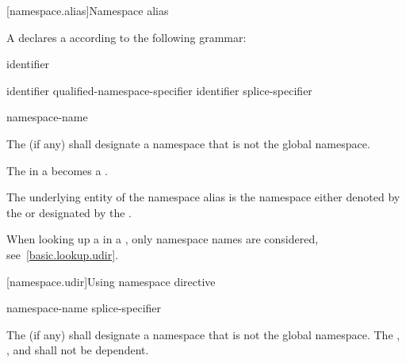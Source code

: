 [namespace.alias]{Namespace alias}%
%
%

\pnum
A  declares a 
according to the following grammar:

\begin{bnf}
\br
        identifier
\end{bnf}

\begin{bnf}
\br
         identifier \terminal{=} qualified-namespace-specifier \terminal{;}\br
         identifier \terminal{=} splice-specifier \terminal{;}
\end{bnf}

\begin{bnf}
\br
     namespace-name
\end{bnf}

\pnum
The  (if any)
shall designate a namespace that is not the global namespace.

\pnum
The  in a 
becomes a .

\pnum
The underlying entity of the namespace alias is
the namespace either
denoted by the  or
designated by the .
\begin{note}
When looking up a  in a
, only namespace names are
considered, see~\ref{basic.lookup.udir}.
\end{note}

[namespace.udir]{Using namespace directive}%

\begin{bnf}
\br
        namespace-name \terminal{;}\br
       splice-specifier \terminal{;}
\end{bnf}

\pnum
The  (if any) shall designate a namespace
that is not the global namespace.
The ,
, and
shall not be dependent.

